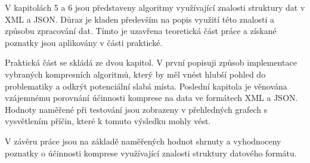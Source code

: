 V kapitolách 5 a 6 jsou představeny algoritmy využívající znalosti struktury dat v XML a JSON. Důraz je kladen především na popis využití této znalosti a způsobu zpracování dat. Tímto je uzavřena teoretická část práce a získané poznatky jsou aplikovány v části praktické.

Praktická část se skládá ze dvou kapitol. V první popisuji způsob implementace vybraných kompresních algoritmů, který by měl vnést hlubší pohled do problematiky a odkrýt potenciální slabá místa. Poslední kapitola je věnována vzájemnému porovnání účinnosti komprese na data ve formátech XML a JSON. Hodnoty naměřené při testování jsou zobrazeny v přehledných grafech s vysvětlením příčin, které k tomuto výsledku mohly vést.

V závěru práce jsou na základě naměřených hodnot shrnuty a vyhodnoceny poznatky o účinnosti komprese využívající znalosti struktury datového formátu.